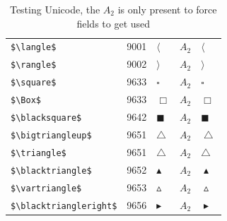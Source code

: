 ﻿\documentclass{article}
\begin{document}
\begin{table}
\begin{center}
\begin{tabular}{llll}
 \verb#$\langle$#             & 9001    & $\langle$             & $A_2\quad \langle$\\
 \verb#$\rangle$#             & 9002    & $\rangle$             & $A_2\quad \rangle$\\
 \verb#$\square$#             & 9633    & $\square$             & $A_2\quad \square$\\
 \verb#$\Box$#                & 9633    & $\Box$                & $A_2\quad \Box$\\
 \verb#$\blacksquare$#        & 9642    & $\blacksquare$        & $A_2\quad \blacksquare$\\
 \verb#$\bigtriangleup$#      & 9651    & $\bigtriangleup$      & $A_2\quad \bigtriangleup$\\
 \verb#$\triangle$#           & 9651    & $\triangle$           & $A_2\quad \triangle$\\
 \verb#$\blacktriangle$#      & 9652    & $\blacktriangle$      & $A_2\quad \blacktriangle$\\
 \verb#$\vartriangle$#        & 9653    & $\vartriangle$        & $A_2\quad \vartriangle$\\
 \verb#$\blacktriangleright$# & 9656    & $\blacktriangleright$ & $A_2\quad \blacktriangleright$\\
\end{tabular}
\end{center}
\caption{Testing Unicode, the $A_2$ is only present to force fields to get used}
\end{table}
\clearpage
\end{document}
